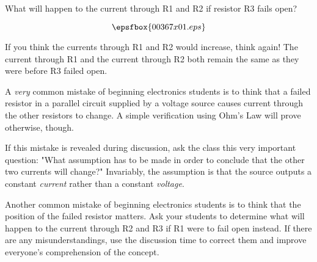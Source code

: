 

What will happen to the current through R1 and R2 if resistor R3 fails open?

$$\epsfbox{00367x01.eps}$$







If you think the currents through R1 and R2 would increase, think again!  The current through R1 and the current through R2 both remain the same as they were before R3 failed open.







A {\it very} common mistake of beginning electronics students is to think that a failed resistor in a parallel circuit supplied by a voltage source causes current through the other resistors to change.  A simple verification using Ohm's Law will prove otherwise, though.

If this mistake is revealed during discussion, ask the class this very important question: "What assumption has to be made in order to conclude that the other two currents will change?"  Invariably, the assumption is that the source outputs a constant {\it current} rather than a constant {\it voltage}.

Another common mistake of beginning electronics students is to think that the position of the failed resistor matters.  Ask your students to determine what will happen to the current through R2 and R3 if R1 were to fail open instead.  If there are any misunderstandings, use the discussion time to correct them and improve everyone's comprehension of the concept.




